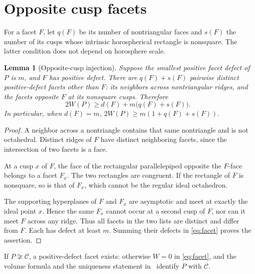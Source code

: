 \documentclass[11pt]{article}
\newtheorem{lemma}[theorem]{Lemma}
\theoremstyle{remark}
\newcommand{\CELL}{\mathcal C}
\begin{document}
\section{Opposite cusp facets}\label{sec:injection}
For a facet $F$, let $q(F)$ be its number of nontriangular faces and
$s(F)$ the number of its cusps whose intrinsic horospherical rectangle
is nonsquare. The latter condition does not depend on horosphere scale.

\begin{lemma}[Opposite-cusp injection]\label{lem:injection}
Suppose the smallest positive facet defect of $P$ is $m$, and $F$ has
positive defect. There are $q(F)+s(F)$ pairwise distinct positive-defect
facets other than $F$: its neighbors across nontriangular ridges, and
the facets opposite $F$ at its nonsquare cusps. Therefore
\begin{equation}\label{eq:budget}
 2W(P)\ge d(F)+m\bigl(q(F)+s(F)\bigr).
\end{equation}
In particular, when $d(F)=m$,
$2W(P)\ge m(1+q(F)+s(F))$.
\end{lemma}
\begin{proof}
A neighbor across a nontriangle contains that same nontriangle and is
not octahedral. Distinct ridges of $F$ have distinct neighboring facets,
since the intersection of two facets is a face.

At a cusp $x$ of $F$, the face of the rectangular parallelepiped opposite
the $F$-face belongs to a facet $F_x$. The two rectangles are congruent.
If the rectangle of $F$ is nonsquare, so is that of $F_x$, which cannot
be the regular ideal octahedron.

The supporting hyperplanes of $F$ and $F_x$ are asymptotic and meet
at exactly the ideal point $x$. Hence the same $F_x$ cannot occur at
a second cusp of $F$, nor can it meet $F$ across any ridge. Thus all
facets in the two lists are distinct and differ from $F$. Each has
defect at least $m$. Summing their defects in \eqref{eq:facet} proves
the assertion.
\end{proof}

If $P\not\cong\CELL$, a positive-defect facet exists: otherwise $W=0$
in \eqref{eq:facet}, and the volume formula and the uniqueness
statement in~\cite[Theorem~3]{Kolpakov} identify $P$ with $\CELL$.
\end{document}
